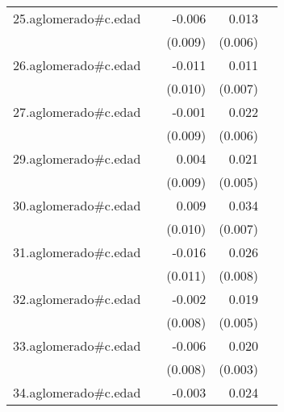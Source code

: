 {\begin{longtable}{l*{4}{D{.}{.}{-1}}}
\addlinespace
25.aglomerado#c.edad&                     &      -0.006         &       0.013\sym{*}  &                     \\
            &                     &     (0.009)         &     (0.006)         &                     \\
\addlinespace
26.aglomerado#c.edad&                     &      -0.011         &       0.011         &                     \\
            &                     &     (0.010)         &     (0.007)         &                     \\
\addlinespace
27.aglomerado#c.edad&                     &      -0.001         &       0.022\sym{***}&                     \\
            &                     &     (0.009)         &     (0.006)         &                     \\
\addlinespace
29.aglomerado#c.edad&                     &       0.004         &       0.021\sym{***}&                     \\
            &                     &     (0.009)         &     (0.005)         &                     \\
\addlinespace
30.aglomerado#c.edad&                     &       0.009         &       0.034\sym{***}&                     \\
            &                     &     (0.010)         &     (0.007)         &                     \\
\addlinespace
31.aglomerado#c.edad&                     &      -0.016         &       0.026\sym{***}&                     \\
            &                     &     (0.011)         &     (0.008)         &                     \\
\addlinespace
32.aglomerado#c.edad&                     &      -0.002         &       0.019\sym{***}&                     \\
            &                     &     (0.008)         &     (0.005)         &                     \\
\addlinespace
33.aglomerado#c.edad&                     &      -0.006         &       0.020\sym{***}&                     \\
            &                     &     (0.008)         &     (0.003)         &                     \\
\addlinespace
34.aglomerado#c.edad&                     &      -0.003         &       0.024\sym{***}&                     \\

\end{longtable}}
